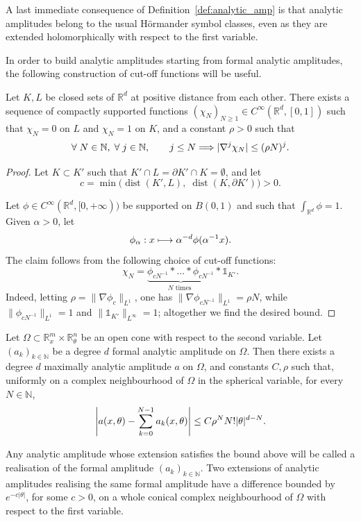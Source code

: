 \documentclass[10pt]{amsart}
\theoremstyle{definition}\newtheorem{defi}[theo]{Definition}\newtheorem{rema}[theo]{Remark}\newtheorem{exam}[theo]{Example}\newtheorem{exem}[theo]{Example}\newtheorem{nota}[theo]{Notation}
\DeclareMathOperator{\dist}{dist}
\newcommand\1{\mathds{1}}
\newcommand{\R}{\mathbb{R}}
\newcommand{\N}{\mathbb{N}}
\let\oldforall\forall
\renewcommand*{\forall}{\mathrel{\oldforall}}
\let\oldmapsto\mapsto
\renewcommand*{\mapsto}{\mathchoice{\longmapsto}{\oldmapsto}{\oldmapsto}{\oldmapsto}}
\renewcommand*{\implies}{\mathchoice{\Longrightarrow}{\Rightarrow}{\Rightarrow}{\Rightarrow}}
\let\originalleft\left
\let\originalright\right
\renewcommand{\left}{\mathopen{}\mathclose\bgroup\originalleft}
\renewcommand{\right}{\aftergroup\egroup\originalright}
\begin{document}
A last immediate consequence of Definition~\ref{def:analytic_amp} is that analytic amplitudes belong to the usual H\"ormander symbol classes, even as they are extended holomorphically with respect to the first variable.


In order to build analytic amplitudes starting from formal analytic amplitudes, the following construction of cut-off functions will be useful.

\begin{prop}
\label{prop:Ehrenpreis}
Let $K,L$ be closed sets of $\R^d$ at positive distance from each other. There exists a sequence of compactly supported functions $(\chi_N)_{N\geq 1}\in C^{\infty}(\R^d,[0,1])$ such that $\chi_N=0$ on $L$ and $\chi_N=1$ on $K$, and a constant $\rho>0$ such that
\begin{equation}\label{eq:Ehrenpreis}
\forall N\in \N,\; \forall j\in \N,\qquad j\leq N\implies |\nabla^j\chi_N|\leq (\rho N)^j.
\end{equation}
\end{prop}
\begin{proof}
Let $K\subset K'$ such that $K'\cap L=\partial K'\cap K=\emptyset $, and let
\[
c=\min\bigl(\dist(K',L),\;\dist(K,\partial K')\bigr)>0.
\]

Let $\phi\in C^{\infty}(\R^d,[0,+\infty))$ be supported on $B(0,1)$ and such that $\int_{\R^d}\phi=1$. Given $\alpha>0$, let
\[
\phi_{\alpha}:x\mapsto \alpha^{-d}\phi(\alpha^{-1}x).
\]
The claim follows from the following choice of cut-off functions:
\[
\chi_N=\underbrace{\phi_{cN^{-1}}*\dots *\phi_{cN^{-1}}}_{N\text{ times }}*\1_{K'}.
\]
Indeed, letting $\rho=\|\nabla \phi_c\|_{L^1}$, one has $\|\nabla
\phi_{cN^{-1}}\|_{L^1}=\rho N$, while $\|\phi_{cN^{-1}}\|_{L^1}=1$ and $\|\1_{K'}\|_{L^{\infty}}=1$; altogether we find the desired bound.
\end{proof}


\begin{prop}\label{prop:real_formal_symb}
Let $\Omega\subset \R^m_x\times \R^n_{\theta}$ be an open cone with respect to the second variable. Let $(a_k)_{k\in \N}$ be a degree $d$ formal analytic amplitude on $\Omega$. Then there exists a degree $d$ maximally analytic amplitude $a$ on $\Omega$, and constants $C,\rho$ such that, uniformly on a complex neighbourhood of $\Omega$ in the spherical variable, for every $N\in \N$,
\[
\left|a(x,\theta)-\sum_{k=0}^{N-1}a_k(x,\theta)\right|\leq C\rho^NN!|\theta|^{d-N}.
\]

Any analytic amplitude whose extension satisfies the bound above will be called a realisation of the formal amplitude $(a_k)_{k\in
\N}$. Two extensions of analytic amplitudes realising the same formal amplitude have a difference bounded by $e^{-c|\theta|}$, for some $c>0$, on a whole conical complex neighbourhood of $\Omega$ with respect to the first variable.
\end{prop}
\end{document}
